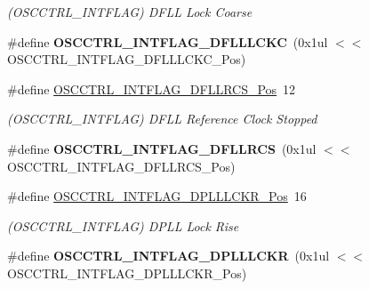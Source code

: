\begin{DoxyCompactItemize}
\begin{DoxyCompactList}\small\item\em (O\+S\+C\+C\+T\+R\+L\+\_\+\+I\+N\+T\+F\+L\+A\+G) D\+F\+L\+L Lock Coarse \end{DoxyCompactList}\item 
\hypertarget{group___s_a_m_l21___o_s_c_c_t_r_l_gad5da27675941f64531932f03be14e10a}{}\#define {\bfseries O\+S\+C\+C\+T\+R\+L\+\_\+\+I\+N\+T\+F\+L\+A\+G\+\_\+\+D\+F\+L\+L\+L\+C\+K\+C}~(0x1ul $<$$<$ O\+S\+C\+C\+T\+R\+L\+\_\+\+I\+N\+T\+F\+L\+A\+G\+\_\+\+D\+F\+L\+L\+L\+C\+K\+C\+\_\+\+Pos)\label{group___s_a_m_l21___o_s_c_c_t_r_l_gad5da27675941f64531932f03be14e10a}

\item 
\hypertarget{group___s_a_m_l21___o_s_c_c_t_r_l_gaef59605a23b051cdd044b9635be34116}{}\#define \hyperlink{group___s_a_m_l21___o_s_c_c_t_r_l_gaef59605a23b051cdd044b9635be34116}{O\+S\+C\+C\+T\+R\+L\+\_\+\+I\+N\+T\+F\+L\+A\+G\+\_\+\+D\+F\+L\+L\+R\+C\+S\+\_\+\+Pos}~12\label{group___s_a_m_l21___o_s_c_c_t_r_l_gaef59605a23b051cdd044b9635be34116}

\begin{DoxyCompactList}\small\item\em (O\+S\+C\+C\+T\+R\+L\+\_\+\+I\+N\+T\+F\+L\+A\+G) D\+F\+L\+L Reference Clock Stopped \end{DoxyCompactList}\item 
\hypertarget{group___s_a_m_l21___o_s_c_c_t_r_l_ga9b7633a6cf4f4af4b980365d43234cb1}{}\#define {\bfseries O\+S\+C\+C\+T\+R\+L\+\_\+\+I\+N\+T\+F\+L\+A\+G\+\_\+\+D\+F\+L\+L\+R\+C\+S}~(0x1ul $<$$<$ O\+S\+C\+C\+T\+R\+L\+\_\+\+I\+N\+T\+F\+L\+A\+G\+\_\+\+D\+F\+L\+L\+R\+C\+S\+\_\+\+Pos)\label{group___s_a_m_l21___o_s_c_c_t_r_l_ga9b7633a6cf4f4af4b980365d43234cb1}

\item 
\hypertarget{group___s_a_m_l21___o_s_c_c_t_r_l_ga1faabca06564e91b62635d5a09cb8df8}{}\#define \hyperlink{group___s_a_m_l21___o_s_c_c_t_r_l_ga1faabca06564e91b62635d5a09cb8df8}{O\+S\+C\+C\+T\+R\+L\+\_\+\+I\+N\+T\+F\+L\+A\+G\+\_\+\+D\+P\+L\+L\+L\+C\+K\+R\+\_\+\+Pos}~16\label{group___s_a_m_l21___o_s_c_c_t_r_l_ga1faabca06564e91b62635d5a09cb8df8}

\begin{DoxyCompactList}\small\item\em (O\+S\+C\+C\+T\+R\+L\+\_\+\+I\+N\+T\+F\+L\+A\+G) D\+P\+L\+L Lock Rise \end{DoxyCompactList}\item 
\hypertarget{group___s_a_m_l21___o_s_c_c_t_r_l_ga089933b3ffb10117cf08d9e94d2f3aef}{}\#define {\bfseries O\+S\+C\+C\+T\+R\+L\+\_\+\+I\+N\+T\+F\+L\+A\+G\+\_\+\+D\+P\+L\+L\+L\+C\+K\+R}~(0x1ul $<$$<$ O\+S\+C\+C\+T\+R\+L\+\_\+\+I\+N\+T\+F\+L\+A\+G\+\_\+\+D\+P\+L\+L\+L\+C\+K\+R\+\_\+\+Pos)\label{group___s_a_m_l21___o_s_c_c_t_r_l_ga089933b3ffb10117cf08d9e94d2f3aef}


\end{DoxyCompactItemize}

